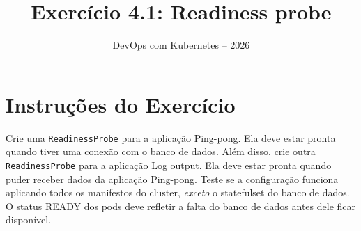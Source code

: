 \documentclass[11pt,a4paper]{article}
\title{\color{secondary}\Huge\textbf{Exercício 4.1: Readiness probe}}
\author{\color{primary}DevOps com Kubernetes -- 2026}
\date{}
\begin{document}
\maketitle

\section*{\color{primary}Instruções do Exercício}
\begin{tcolorbox}[colback=blue!5!white,colframe=blue!75!black,title=Exercício 4.1: Readiness probe]
Crie uma \texttt{ReadinessProbe} para a aplicação Ping-pong. Ela deve estar pronta quando tiver uma conexão com o banco de dados. Além disso, crie outra \texttt{ReadinessProbe} para a aplicação Log output. Ela deve estar pronta quando puder receber dados da aplicação Ping-pong. Teste se a configuração funciona aplicando todos os manifestos do cluster, \textit{exceto} o statefulset do banco de dados. O status READY dos pods deve refletir a falta do banco de dados antes dele ficar disponível.
\end{tcolorbox}
\end{document}
